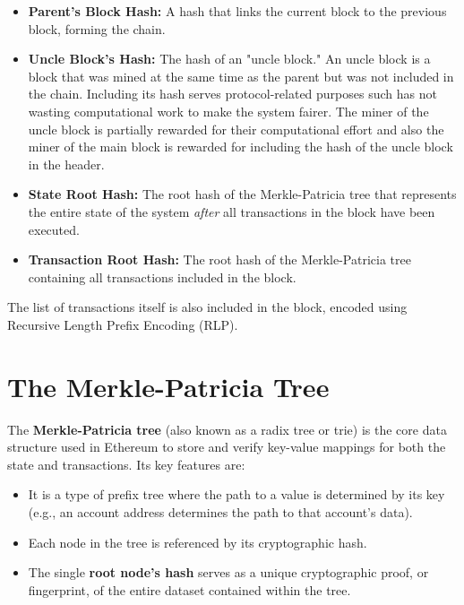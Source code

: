 \documentclass{scrbook}
\begin{document}
\begin{itemize}
    \item \textbf{Parent's Block Hash:} A hash that links the current block to the previous block, forming the chain.
    
    \item \textbf{Uncle Block's Hash:} The hash of an "uncle block." An uncle block is a block that was mined at the same time as the parent but was not included in the chain. Including its hash serves protocol-related purposes such has not wasting computational work to make the system fairer. The miner of the uncle block is partially rewarded for their computational effort and also the miner of the main block is rewarded for including the hash of the uncle block in the header.
    
    \item \textbf{State Root Hash:} The root hash of the Merkle-Patricia tree that represents the entire state of the system \textit{after} all transactions in the block have been executed.
    
    \item \textbf{Transaction Root Hash:} The root hash of the Merkle-Patricia tree containing all transactions included in the block.
\end{itemize}

The list of transactions itself is also included in the block, encoded using Recursive Length Prefix Encoding (RLP).

\section{The Merkle-Patricia Tree}

The \textbf{Merkle-Patricia tree} (also known as a radix tree or trie) is the core data structure used in Ethereum to store and verify key-value mappings for both the state and transactions. Its key features are:

\begin{itemize}
    \item It is a type of prefix tree where the path to a value is determined by its key (e.g., an account address determines the path to that account's data).
    \item Each node in the tree is referenced by its cryptographic hash.
    \item The single \textbf{root node's hash} serves as a unique cryptographic proof, or fingerprint, of the entire dataset contained within the tree.
\end{itemize}
\end{document}
